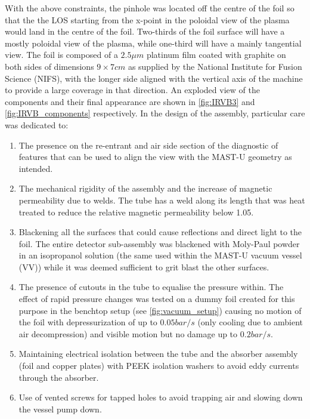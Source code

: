 With the above constraints, the pinhole was located off the centre of the foil so that the the LOS starting from the x-point in the poloidal view of the plasma would land in the centre of the foil. Two-thirds of the foil surface will have a mostly poloidal view of the plasma, while one-third will have a mainly tangential view. The foil is composed of a $2.5\mu m$ platinum film coated with graphite on both sides of dimensions ${9\times7cm}$ as supplied by the National Institute for Fusion Science (NIFS), with the longer side aligned with the vertical axis of the machine to provide a large coverage in that direction. An exploded view of the components and their final appearance are shown in 
\autoref{fig:IRVB3} and \autoref{fig:IRVB_components} respectively.
In the design of the assembly, particular care was dedicated to:
\begin{enumerate}
    \item The presence on the re-entrant and air side section of the diagnostic of features that can be used to align the view with the MAST-U geometry as intended.
    \item The mechanical rigidity of the assembly and the increase of magnetic permeability due to welds. The tube has a weld along its length that was heat treated to reduce the relative magnetic permeability below 1.05.
    \item Blackening all the surfaces that could cause reflections and direct light to the foil. The entire detector sub-assembly was blackened with Moly-Paul powder in an isopropanol solution (the same used within the MAST-U vacuum vessel (VV)) while it was deemed sufficient to grit blast the other surfaces.
    \item The presence of cutouts in the tube to equalise the pressure within. The effect of rapid pressure changes was tested on a dummy foil created for this purpose in the benchtop setup (see \autoref{fig:vacuum_setup}) causing no motion of the foil with depressurization of up to $0.05bar/s$ (only cooling due to ambient air decompression) and visible motion but no damage up to $0.2bar/s$.
    \item Maintaining electrical isolation between the tube and the absorber assembly (foil and copper plates) with PEEK isolation washers to avoid eddy currents through the absorber.
    \item Use of vented screws for tapped holes to avoid trapping air and slowing down the vessel pump down.
\end{enumerate}

